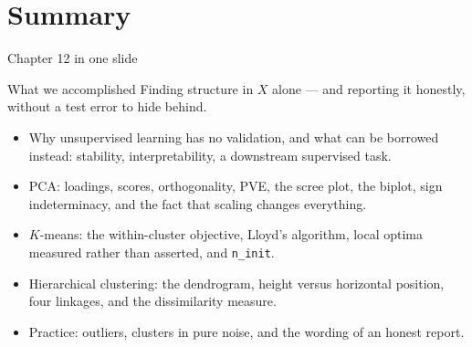 \documentclass[aspectratio=169,11pt]{beamer}
\begin{document}
\section{Summary}

\begin{frame}{Chapter 12 in one slide}
  \begin{block}{What we accomplished}
    Finding structure in $X$ alone --- and reporting it honestly, without a test error to
    hide behind.
  \end{block}
  \begin{itemize}
    \item Why unsupervised learning has no validation, and what can be borrowed instead:
          stability, interpretability, a downstream supervised task.
    \item PCA: loadings, scores, orthogonality, PVE, the scree plot, the biplot, sign
          indeterminacy, and the fact that scaling changes everything.
    \item $K$-means: the within-cluster objective, Lloyd's algorithm, local optima
          measured rather than asserted, and \texttt{n\_init}.
    \item Hierarchical clustering: the dendrogram, height versus horizontal position,
          four linkages, and the dissimilarity measure.
    \item Practice: outliers, clusters in pure noise, and the wording of an honest report.
  \end{itemize}
\end{frame}
\end{document}

